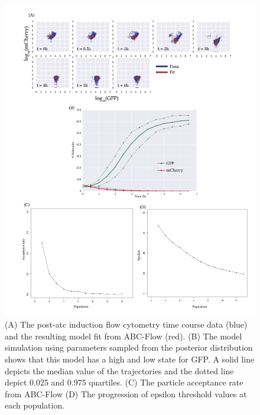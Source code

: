 \begin{figure}[tb]
\centerfloat
	\includegraphics[width=1.2\textwidth]{../../chapters/chapterABCFlow/images/2D_real_res.png}
	\caption[ABC-Flow fit to post-\acrshort{atc} time course data]{\label{fig:1d-real-res} (A) The post-\acrshort{atc} induction flow cytometry time course data (blue) and the resulting model fit from ABC-Flow (red). (B) The model simulation using parameters sampled from the posterior distribution shows that this model has a high and low state for GFP. A solid line depicts the median value of the trajectories and the dotted line depict 0.025 and 0.975 quartiles. (C) The particle acceptance rate from ABC-Flow (D) The progression of epsilon threshold values at each population.}
\end{figure}



